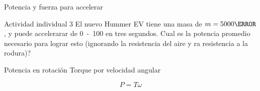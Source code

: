 \documentclass[presentation,aspectratio=169]{beamer}
\begin{document}
\begin{frame}[label={sec:orgd3dc50b}]{Potencia y fuerza para accelerar}
   \begin{center}
\end{center}


\alert{Actividad individual 3} El nuevo Hummer EV tiene una masa de \(m=\unit{5000}{\kilogram}\), y puede accelerarar de \unit{0 - 100}{\kilo\meter\per\hour} en tres segundos. Cual es la potencia promedio necesario para lograr esto (ignorando la resistencia del aire y ra resistencia a la rodura)?
\end{frame}

\begin{frame}[label={sec:orgde875e1}]{Potencia en rotación}
\alert{Torque} por \alert{velocidad angular}

\[ P = T\omega\]
\end{frame}
\end{document}
